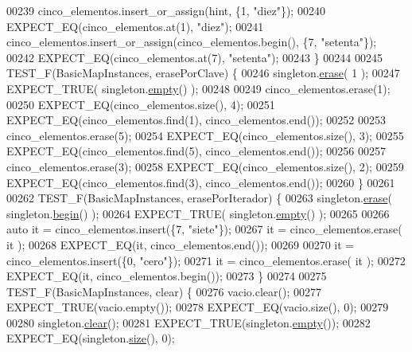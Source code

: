 \begin{DoxyCode}
00239     cinco\_elementos.insert\_or\_assign(hint, \{1, \textcolor{stringliteral}{"diez"}\});
00240     EXPECT\_EQ(cinco\_elementos.at(1), \textcolor{stringliteral}{"diez"});
00241     cinco\_elementos.insert\_or\_assign(cinco\_elementos.begin(), \{7, \textcolor{stringliteral}{"setenta"}\});
00242     EXPECT\_EQ(cinco\_elementos.at(7), \textcolor{stringliteral}{"setenta"});
00243 \}
00244 
00245 TEST\_F(BasicMapInstances, erasePorClave) \{
00246     singleton.\hyperlink{classaed2_1_1map_ad8e796bf9c9c558e5ce6b61e116253fe_ad8e796bf9c9c558e5ce6b61e116253fe}{erase}( 1 );
00247     EXPECT\_TRUE( singleton.\hyperlink{classaed2_1_1map_af5320ca0a7df4d16015441d5d055a7ee_af5320ca0a7df4d16015441d5d055a7ee}{empty}() );
00248 
00249     cinco\_elementos.erase(1);
00250     EXPECT\_EQ(cinco\_elementos.size(), 4);
00251     EXPECT\_EQ(cinco\_elementos.find(1), cinco\_elementos.end());
00252 
00253     cinco\_elementos.erase(5);
00254     EXPECT\_EQ(cinco\_elementos.size(), 3);
00255     EXPECT\_EQ(cinco\_elementos.find(5), cinco\_elementos.end());
00256 
00257     cinco\_elementos.erase(3);
00258     EXPECT\_EQ(cinco\_elementos.size(), 2);
00259     EXPECT\_EQ(cinco\_elementos.find(3), cinco\_elementos.end());
00260 \}
00261 
00262 TEST\_F(BasicMapInstances, erasePorIterador) \{
00263     singleton.\hyperlink{classaed2_1_1map_ad8e796bf9c9c558e5ce6b61e116253fe_ad8e796bf9c9c558e5ce6b61e116253fe}{erase}( singleton.\hyperlink{classaed2_1_1map_a58a95705d54b3dda7f775ce5a22225cb_a58a95705d54b3dda7f775ce5a22225cb}{begin}() );
00264     EXPECT\_TRUE( singleton.\hyperlink{classaed2_1_1map_af5320ca0a7df4d16015441d5d055a7ee_af5320ca0a7df4d16015441d5d055a7ee}{empty}() );
00265 
00266     \textcolor{keyword}{auto} it = cinco\_elementos.insert(\{7, \textcolor{stringliteral}{"siete"}\});
00267     it = cinco\_elementos.erase( it );
00268     EXPECT\_EQ(it, cinco\_elementos.end());
00269 
00270     it = cinco\_elementos.insert(\{0, \textcolor{stringliteral}{"cero"}\});
00271     it = cinco\_elementos.erase( it );
00272     EXPECT\_EQ(it, cinco\_elementos.begin());
00273 \}
00274 
00275 TEST\_F(BasicMapInstances, clear) \{
00276     vacio.clear();
00277     EXPECT\_TRUE(vacio.empty());
00278     EXPECT\_EQ(vacio.size(), 0);
00279 
00280     singleton.\hyperlink{classaed2_1_1map_a2bfa5165825979bf2431db55bc6bc9ca_a2bfa5165825979bf2431db55bc6bc9ca}{clear}();
00281     EXPECT\_TRUE(singleton.\hyperlink{classaed2_1_1map_af5320ca0a7df4d16015441d5d055a7ee_af5320ca0a7df4d16015441d5d055a7ee}{empty}());
00282     EXPECT\_EQ(singleton.\hyperlink{classaed2_1_1map_a89f2613f926ac13293eafe65889d6021_a89f2613f926ac13293eafe65889d6021}{size}(), 0);

\end{DoxyCode}
